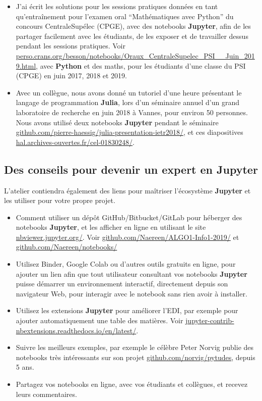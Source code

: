 \documentclass[runningheads]{llncs}
\newcommand{\Jupyter}{\textbf{Jupyter}}
\begin{document}
\begin{itemize}
    \item
    J'ai écrit les solutions pour les sessions pratiques données en tant qu'entraînement pour l'examen oral ``Mathématiques avec Python'' du concours CentraleSupélec (CPGE), avec des notebooks \Jupyter, afin de les partager facilement avec les étudiants, de les exposer et de travailler dessus pendant les sessions pratiques.
    Voir \url{perso.crans.org/besson/notebooks/Oraux_CentraleSupelec_PSI__Juin_2019.html},
    avec \textbf{Python} et des maths,
    pour les étudiants d'une classe du PSI (CPGE) en juin 2017, 2018 et 2019.

    \item
    Avec un collègue, nous avons donné un tutoriel d'une heure présentant le langage de programmation \textbf{Julia}, lors d'un séminaire annuel d'un grand laboratoire de recherche en juin 2018 à Vannes, pour environ 50 personnes.
    Nous avons utilisé deux notebooks \Jupyter{} pendant le séminaire \url{github.com/pierre-haessig/julia-presentation-ietr2018/},
    et ces diapositives \url{hal.archives-ouvertes.fr/cel-01830248/}.

\end{itemize}


\subsection*{Des conseils pour devenir un expert en \Jupyter}

L'atelier contiendra également des liens pour maîtriser l'écosystème \Jupyter{} et les utiliser pour votre propre projet.

\begin{itemize}
    \item Comment utiliser un dépôt GitHub/Bitbucket/GitLab pour héberger des notebooks \Jupyter{}, et les afficher en ligne en utilisant le site \url{nbviewer.jupyter.org/}.
    Voir \url{github.com/Naereen/ALGO1-Info1-2019/} et \url{github.com/Naereen/notebooks/}
    \item Utilisez Binder, Google Colab ou d'autres outils gratuits en ligne, pour ajouter un lien afin que tout utilisateur consultant vos notebooks \Jupyter{} puisse démarrer un environnement interactif, directement depuis son navigateur Web, pour interagir avec le notebook sans rien avoir à installer.
    \item Utilisez les extensions \Jupyter{} pour améliorer l'EDI, par exemple pour ajouter automatiquement une table des matières. Voir \url{jupyter-contrib-nbextensions.readthedocs.io/en/latest/}.
    \item Suivre les meilleurs exemples, par exemple le célèbre Peter Norvig publie des notebooks très intéressants sur son projet \url{github.com/norvig/pytudes}, depuis 5 ans.
    \item Partagez vos notebooks en ligne, avec vos étudiants et collègues, et recevez leurs commentaires.
\end{itemize}
\end{document}
